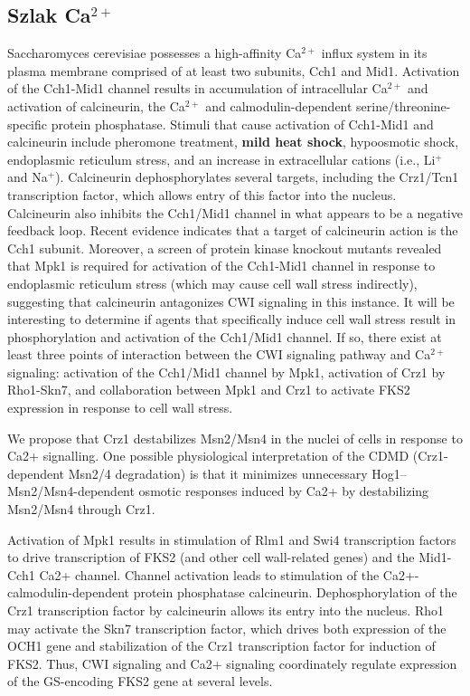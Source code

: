 \documentclass{pracamgr}
\begin{document}
\subsection{Szlak Ca$^{2+}$}
Saccharomyces cerevisiae possesses a
high-affinity Ca$^{2+}$ influx system in its plasma membrane comprised of at least two subunits, Cch1 and Mid1. 
Activation of the Cch1-Mid1 channel
results in accumulation of intracellular Ca$^{2+}$ and activation of
calcineurin, the Ca$^{2+}$ and calmodulin-dependent serine/threonine-specific
protein phosphatase. Stimuli that cause activation of Cch1-Mid1
and calcineurin include pheromone treatment, {\bf mild heat shock}, hypoosmotic shock,
endoplasmic reticulum stress, and an increase in extracellular cations (i.e., Li$^+$ and Na$^+$).
Calcineurin dephosphorylates several targets, including the
Crz1/Tcn1 transcription factor, which allows entry of
this factor into the nucleus. Calcineurin also inhibits the
Cch1/Mid1 channel in what appears to be a negative feedback
loop. Recent evidence indicates that a target of
calcineurin action is the Cch1 subunit. Moreover, a screen
of protein kinase knockout mutants revealed that Mpk1 is
required for activation of the Cch1-Mid1 channel in response
to endoplasmic reticulum stress (which may cause cell wall
stress indirectly), suggesting that calcineurin antagonizes CWI
signaling in this instance. It will be interesting to determine
if agents that specifically induce cell wall stress result in
phosphorylation and activation of the Cch1/Mid1 channel. If
so, there exist at least three points of interaction between the
CWI signaling pathway and Ca$^{2+}$ signaling: activation of the
Cch1/Mid1 channel by Mpk1, activation of Crz1 by Rho1-Skn7,
and collaboration between Mpk1 and Crz1 to activate
FKS2 expression in response to cell wall stress.\cite{CWI}


We propose that Crz1 destabilizes Msn2/Msn4 in the nuclei of cells in response to Ca2+ signalling.
One possible physiological interpretation of the CDMD (Crz1-dependent Msn2/4 degradation) is that it minimizes unnecessary
Hog1–Msn2/Msn4-dependent osmotic responses induced by Ca2+ by destabilizing Msn2/Msn4 through Crz1.\cite{Crz1DestabilizesMsn}

Activation of Mpk1 results in
stimulation of Rlm1 and Swi4 transcription factors to drive 
transcription of FKS2 (and other cell wall-related genes) and the Mid1-Cch1
Ca2+ channel. Channel activation leads to stimulation of the Ca2+-
calmodulin-dependent protein phosphatase calcineurin. 
Dephosphorylation of the Crz1 transcription factor by calcineurin allows its entry
into the nucleus. Rho1 may activate the Skn7 transcription factor,
which drives both expression of the OCH1 gene and
stabilization of the Crz1 transcription factor for induction of FKS2.
Thus, CWI signaling and Ca2+ signaling coordinately regulate
expression of the GS-encoding FKS2 gene at several levels.\cite{CWI}
\end{document}
